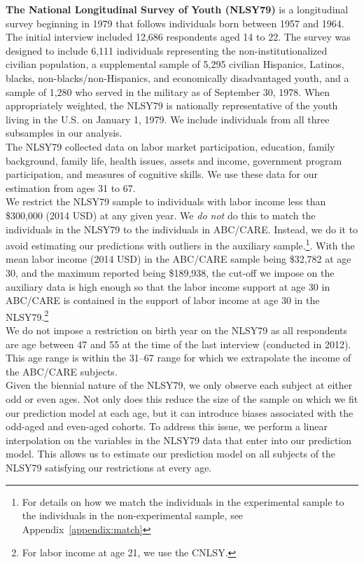 \noindent \textbf{The National Longitudinal Survey of Youth (NLSY79)} is a longitudinal survey beginning in 1979 that follows individuals born between 1957 and 1964. The initial interview included 12,686 respondents aged 14 to 22. The survey was designed to include 6,111 individuals representing the non-institutionalized civilian population, a supplemental sample of 5,295 civilian Hispanics, Latinos, blacks, non-blacks/non-Hispanics, and economically disadvantaged youth, and a sample of 1,280 who served in the military as of September 30, 1978. When appropriately weighted, the NLSY79 is nationally representative of the youth living in the U.S. on January 1, 1979. We include individuals from all three subsamples in our analysis. \\

\noindent The NLSY79 collected data on labor market participation, education, family background, family life, health issues, assets and income, government program participation, and measures of cognitive skills. We use these data for our estimation from ages 31 to 67.\\

\noindent We restrict the NLSY79 sample to individuals with labor income less than \$300,000 (2014 USD) at any given year. We \textit{do not} do this to match the individuals in the NLSY79 to the individuals in ABC/CARE. Instead, we do it to avoid estimating our predictions with outliers in the auxiliary sample.\footnote{For details on how we match the individuals in the experimental sample to the individuals in the non-experimental sample, see Appendix~\ref{appendix:match}}. With the mean labor income (2014 USD) in the ABC/CARE sample being \$32,782 at age 30, and the maximum reported being \$189,938, the cut-off we impose on the auxiliary data is high enough so that the labor income support at age 30 in ABC/CARE is contained in the support of labor income at age 30 in the NLSY79.\footnote{For labor income at age 21, we use the CNLSY.}\\

\noindent We do not impose a restriction on birth year on the NLSY79 as all respondents are age between 47 and 55 at the time of the last interview (conducted in 2012). This age range is within the 31--67 range for which we extrapolate the income of the ABC/CARE subjects. \\

\noindent Given the biennial nature of the NLSY79, we only observe each subject at either odd or even ages. Not only does this reduce the size of the sample on which we fit our prediction model at each age, but it can introduce biases associated with the odd-aged and even-aged cohorts. To address this issue, we perform a linear interpolation on the variables in the NLSY79 data that enter into our prediction model. This allows us to estimate our prediction model on all subjects of the NLSY79 satisfying our restrictions at every age. \\

